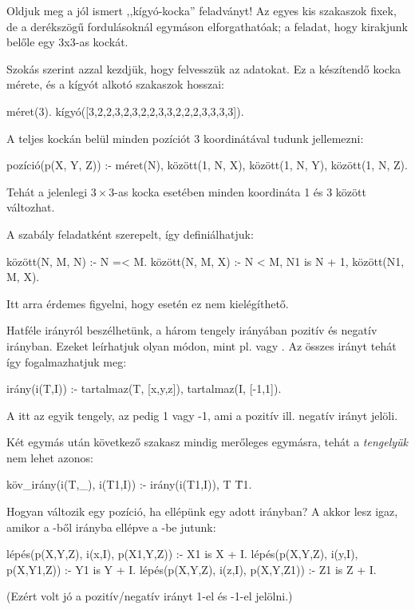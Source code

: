 Oldjuk meg a jól ismert ,,kígyó-kocka'' feladványt!
Az egyes kis szakaszok fixek, de a derékszögű
fordulásoknál egymáson elforgathatóak; a feladat,
hogy kirakjunk belőle egy 3x3-as kockát.

Szokás szerint azzal kezdjük, hogy felvesszük az
adatokat. Ez a készítendő kocka mérete, és a kígyót
alkotó szakaszok hosszai:
\begin{program}
méret(3).
kígyó([3,2,2,3,2,3,2,2,3,3,2,2,2,3,3,3,3]).
\end{program}

A teljes kockán belül minden pozíciót 3
koordinátával tudunk jellemezni:
\begin{program}
pozíció(p(X, Y, Z)) :-
    méret(N), között(1, N, X),
    között(1, N, Y), között(1, N, Z).
\end{program}
Tehát a jelenlegi $3\times3$-as kocka esetében minden
koordináta 1 és 3 között változhat.

A  szabály feladatként szerepelt,
így definiálhatjuk:
\begin{program}
között(N, M, N) :- N =< M.
között(N, M, X) :-
    N < M, N1 is N + 1,
    között(N1, M, X).
\end{program}
Itt arra érdemes figyelni, hogy  esetén ez
nem kielégíthető.

Hatféle irányról beszélhetünk, a három tengely
irányában pozitív és negatív irányban. Ezeket
leírhatjuk olyan módon, mint pl.  vagy
. Az összes irányt tehát így
fogalmazhatjuk meg:
\begin{program}
irány(i(T,I)) :-
    tartalmaz(T, [x,y,z]),
    tartalmaz(I, [-1,1]).
\end{program}
A  itt az egyik tengely, az  pedig 1
vagy -1, ami a pozitív ill. negatív irányt jelöli.

Két egymás után következő szakasz mindig merőleges
egymásra, tehát a \emph{tengelyük} nem lehet azonos:
\begin{program}
köv_irány(i(T,_), i(T1,I)) :-
    irány(i(T1,I)), T \= T1.
\end{program}

Hogyan változik egy pozíció, ha ellépünk egy adott
irányban? A  akkor lesz igaz,
amikor a -ből  irányba ellépve a
-be jutunk:
\begin{program}
lépés(p(X,Y,Z), i(x,I), p(X1,Y,Z)) :- X1 is X + I.
lépés(p(X,Y,Z), i(y,I), p(X,Y1,Z)) :- Y1 is Y + I.
lépés(p(X,Y,Z), i(z,I), p(X,Y,Z1)) :- Z1 is Z + I.
\end{program}
(Ezért volt jó a pozitív/negatív irányt 1-el és
-1-el jelölni.)

